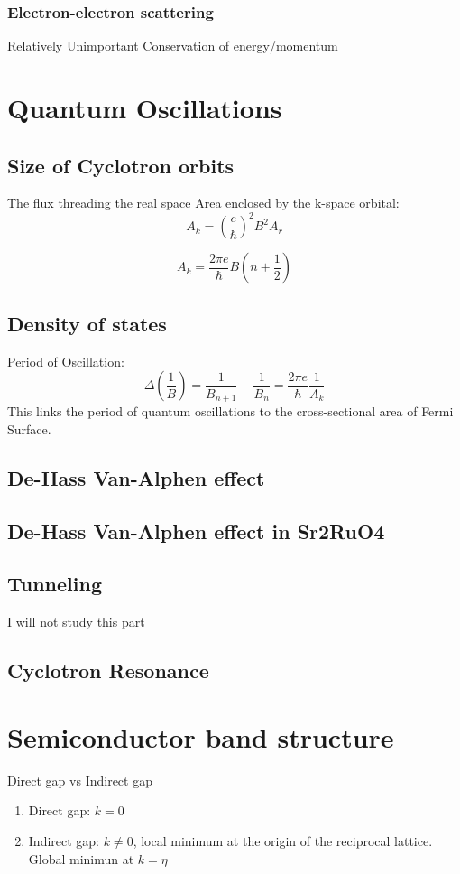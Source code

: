 \documentclass[12pt,a4paper]{article}
\begin{document}
\subsubsection{Electron-electron scattering}
Relatively Unimportant
Conservation of energy/momentum

\section{Quantum Oscillations}
\subsection{Size of Cyclotron orbits}
The flux threading the real space 
Area enclosed by the k-space orbital:
$$
A_k=\left(\frac{e}{\hbar}\right)^2 B^2 A_r
$$

$$
A_k=\frac{2 \pi e}{\hbar} B\left(n+\frac{1}{2}\right)
$$
\subsection{Density of states}
Period of Oscillation:
$$
\Delta\left(\frac{1}{B}\right)=\frac{1}{B_{n+1}}-\frac{1}{B_n}=\frac{2 \pi e}{\hbar} \frac{1}{A_k}
$$
This links the period of quantum oscillations to the cross-sectional area of Fermi Surface.
\subsection{De-Hass Van-Alphen effect}
\subsection{De-Hass Van-Alphen effect in Sr2RuO4}
\subsection{Tunneling}
I will not study this part 
\subsection{Cyclotron Resonance}

\section{Semiconductor band structure}
Direct gap vs Indirect gap
\begin{enumerate}
    \item Direct gap: $k=0$
    \item Indirect gap: $k\neq 0$, local minimum at the origin of the reciprocal lattice. Global minimun at $k = \eta$
\end{enumerate}
\end{document}
